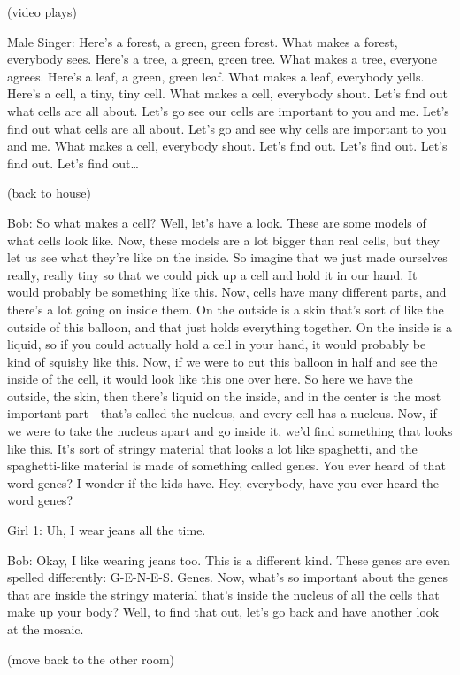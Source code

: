 (video plays)

Male Singer: Here's a forest, a green, green forest. What makes a forest, everybody sees. Here's a tree, a green, green tree. What makes a tree, everyone agrees. Here's a leaf, a green, green leaf. What makes a leaf, everybody yells. Here's a cell, a tiny, tiny cell. What makes a cell, everybody shout. Let's find out what cells are all about. Let's go see our cells are important to you and me. Let's find out what cells are all about. Let's go and see why cells are important to you and me. What makes a cell, everybody shout. Let's find out. Let's find out. Let's find out. Let's find out\dots

(back to house)

Bob: So what makes a cell? Well, let's have a look. These are some models of what cells look like. Now, these models are a lot bigger than real cells, but they let us see what they're like on the inside. So imagine that we just made ourselves really, really tiny so that we could pick up a cell and hold it in our hand. It would probably be something like this. Now, cells have many different parts, and there's a lot going on inside them. On the outside is a skin that's sort of like the outside of this balloon, and that just holds everything together. On the inside is a liquid, so if you could actually hold a cell in your hand, it would probably be kind of squishy like this. Now, if we were to cut this balloon in half and see the inside of the cell, it would look like this one over here. So here we have the outside, the skin, then there's liquid on the inside, and in the center is the most important part - that's called the nucleus, and every cell has a nucleus. Now, if we were to take the nucleus apart and go inside it, we'd find something that looks like this. It's sort of stringy material that looks a lot like spaghetti, and the spaghetti-like material is made of something called genes. You ever heard of that word genes? I wonder if the kids have. Hey, everybody, have you ever heard the word genes?

Girl 1: Uh, I wear jeans all the time.

Bob: Okay, I like wearing jeans too. This is a different kind. These genes are even spelled differently: G-E-N-E-S. Genes. Now, what's so important about the genes that are inside the stringy material that's inside the nucleus of all the cells that make up your body? Well, to find that out, let's go back and have another look at the mosaic.

(move back to the other room)

